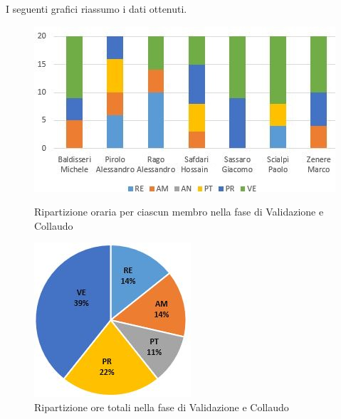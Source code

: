 I seguenti grafici riassumo i dati ottenuti.

\begin{figure}[!htb]
   \begin{minipage}{0.6\textwidth}
     \centering
     \includegraphics{Images/PO-Verifica}
     \caption{Ripartizione oraria per ciascun membro nella fase di Validazione e Collaudo}
   \end{minipage}\hspace{0.1\textwidth}
   \begin{minipage}{0.3\textwidth}
     \centering
     \includegraphics[width=.9\textwidth]{Images/PE-Verifica}
     \captionsetup{width=1\textwidth}
     \caption{Ripartizione ore totali nella fase di Validazione e Collaudo}
   \end{minipage}
\end{figure}